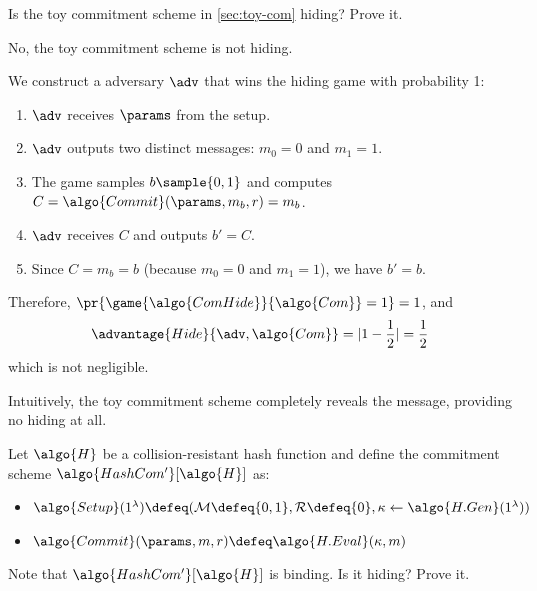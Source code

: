 \begin{exercise}
  Is the toy commitment scheme in \cref{sec:toy-com} hiding?
  Prove it.
\end{exercise}

\ifsolutions
\begin{mysolution}
  No, the toy commitment scheme is not hiding.

  We construct a \ppt adversary $\adv$ that wins the hiding game with probability 1:

  \begin{enumerate}
    \item $\adv$ receives $\params$ from the setup.
    \item $\adv$ outputs two distinct messages: $m_0 = 0$ and $m_1 = 1$.
    \item The game samples $b \sample \{0, 1\}$ and computes $C = \algo{Commit}(\params, m_b, r) = m_b$.
    \item $\adv$ receives $C$ and outputs $b' = C$.
    \item Since $C = m_b = b$ (because $m_0 = 0$ and $m_1 = 1$), we have $b' = b$.
  \end{enumerate}

  Therefore, $\pr{\game{\algo{ComHide}}{\algo{Com}} = 1} = 1$, and 
  \[
    \advantage{Hide}{\adv, \algo{Com}} = |1 - \frac{1}{2}| = \frac{1}{2}
  \]
  which is not negligible.

  Intuitively, the toy commitment scheme completely reveals the message, providing no hiding at all.
\end{mysolution}
\fi

\begin{exercise}
  Let $\algo{H}$ be a collision-resistant hash function and define the commitment scheme $\algo{HashCom'}[\algo{H}]$ as:
  \begin{itemize}
    \item $\algo{Setup}(1^\lambda) \defeq (\mathcal{M} \defeq \{0, 1\}, \mathcal{R} \defeq \{0\}, \kappa \gets \algo{H.Gen}(1^\lambda))$
    \item $\algo{Commit}(\params, m, r) \defeq \algo{H.Eval}(\kappa, m)$
  \end{itemize}
  Note that $\algo{HashCom'}[\algo{H}]$ is binding.
  Is it hiding?
  Prove it.
\end{exercise}

